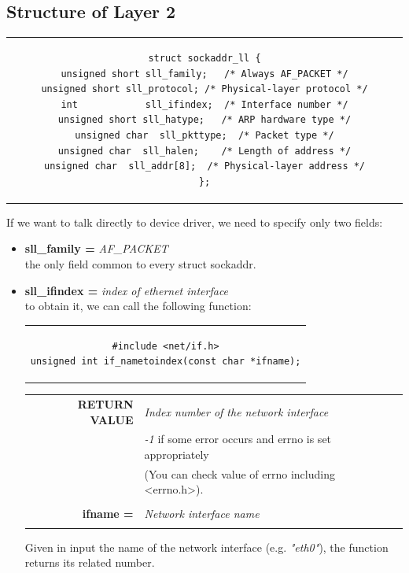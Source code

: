 \subsection{Structure of Layer 2}
\begin{center}
\begin{tabular}{c}
\begin{lstlisting}[linewidth=320pt, basicstyle=\footnotesize\sffamily,]
struct sockaddr_ll {                                                                unsigned short sll_family;   /* Always AF_PACKET */                             unsigned short sll_protocol; /* Physical-layer protocol */                      int            sll_ifindex;  /* Interface number */                             unsigned short sll_hatype;   /* ARP hardware type */                            unsigned char  sll_pkttype;  /* Packet type */                                  unsigned char  sll_halen;    /* Length of address */                            unsigned char  sll_addr[8];  /* Physical-layer address */                   };
\end{lstlisting}
\end{tabular}
\end{center}
If we want to talk directly to device driver, we need to specify only two fields:
\begin{itemize}
\item{\textbf{sll\_family =} \textit{AF\_PACKET}\\
the only field common to every struct sockaddr.
}
\item{\textbf{sll\_ifindex =} \textit{index of ethernet interface}\\
to obtain it, we can call the following function:
\begin{center}
\begin{tabular}{c}
\begin{lstlisting}[linewidth=260pt, basicstyle=\footnotesize\sffamily,]
#include <net/if.h>
unsigned int if_nametoindex(const char *ifname);
\end{lstlisting}
\end{tabular}
\end{center}
\begin{table}[H]
\centering\footnotesize
\begin{tabular}{rl}
\textbf{RETURN VALUE} & {\textit{Index number of the network interface}}\\
{} & {\textit{-1} if some error occurs and errno is set appropriately}\\
{} & {(You can check value of errno including <errno.h>).}\\
& \\
\textbf{ifname =} & {\textit{Network interface name}}\\
&\\
\end{tabular}
\end{table}
Given in input the name of the network interface (e.g. \textit{"eth0"}), the function returns its related number.
}
\end{itemize}